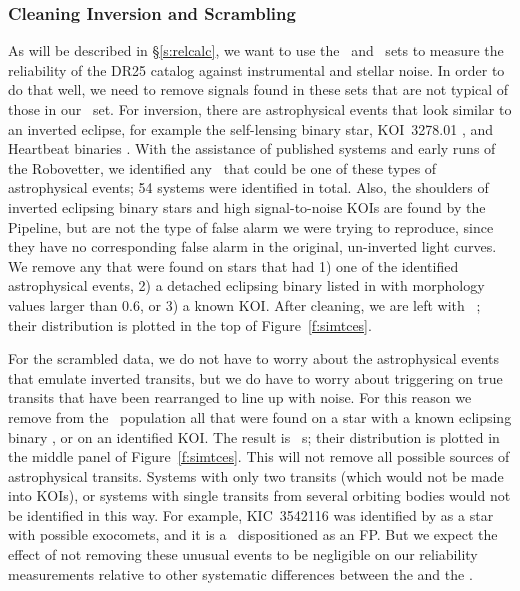 \subsubsection{Cleaning Inversion and Scrambling}
\label{s:clean}
As will be described in \S\ref{s:relcalc}, we want to use the \invtce\ and \scrtce\ sets to measure the reliability of the DR25 catalog against instrumental and stellar noise. In order to do that well, we need to remove signals found in these sets that are not typical of those in our \opstce\ set. For inversion, there are astrophysical events that look similar to an inverted eclipse, for example the self-lensing binary star, KOI~3278.01 \citep{Kruse2014}, and Heartbeat binaries \citep{Thompson2012}. With the assistance of published systems and early runs of the Robovetter, we identified any \invtce\ that could be one of these types of astrophysical events; 54 systems were identified in total. Also, the shoulders of inverted eclipsing binary stars and high signal-to-noise KOIs are found by the Pipeline, but are not the type of false alarm we were trying to reproduce, since they have no corresponding false alarm in the original, un-inverted light curves. We remove any  that were found on stars that had 1) one of the identified astrophysical events, 2) a detached eclipsing binary listed in \citet{Kirk2016} with morphology values larger than 0.6, or 3) a known KOI.  After cleaning, we are left with \ninvtces\ ; their distribution is plotted in the top of Figure~\ref{f:simtces}.

For the scrambled data, we do not have to worry about the astrophysical events that emulate inverted transits, but we do have to worry about triggering on true transits that have been rearranged to line up with noise. For this reason we remove from the \scrtce\ population all that were found on a star with a known eclipsing binary \citep{Kirk2016}, or on an identified KOI.  The result is \nscrtces\ \scrtce s; their distribution is plotted in the middle panel of Figure~\ref{f:simtces}. 
This will not remove all possible sources of astrophysical transits. Systems with only two transits (which would not be made into KOIs), or systems with single transits from several orbiting bodies would not be identified in this way. For example, KIC~3542116 was identified by \citet{Rappaport2017} as a star with possible exocomets, and it is a \scrtce\ dispositioned as an FP.  But we expect the effect of not removing these unusual events to be negligible on our reliability measurements relative to other systematic differences between the  and the .


